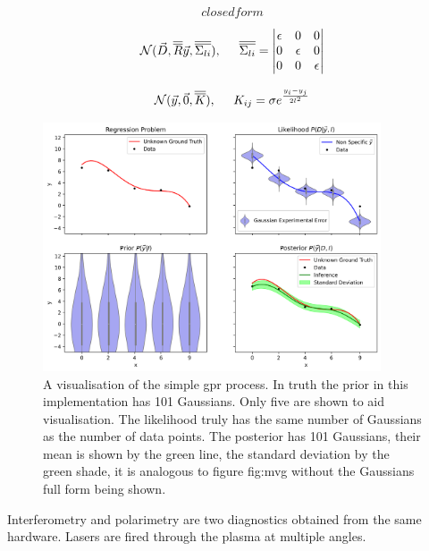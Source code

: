 \begin{equation}
  closed form
  \label{eq:closedform}
\end{equation}

\begin{equation}
    \mathcal{N}(\Vec{D}, \overline{\overline{R}}\Vec{y}, \overline{\overline{\Sigma_{li}}}),\hspace{0.5cm} \overline{\overline{\Sigma_{li}}} = 
      \begin{vmatrix}
          \epsilon & 0 & 0\\
          0 & \epsilon & 0\\
          0 & 0 & \epsilon
      \end{vmatrix}
    \label{eq:likelihood}
\end{equation}

\begin{equation}
  \mathcal{N}(\Vec{y}, \Vec{0}, \overline{\overline{K}}),\hspace{0.5cm} K_{ij} = \sigma e^{\frac{y_i - y_j}{2l^2}}
  \label{eq:prior}
\end{equation}

\begin{figure}
  \centering
  \includegraphics[width=10cm]{images/gprvis.png}
  \caption{A visualisation of the simple \gls{gpr} process. In truth the prior in this implementation has 101 Gaussians. Only five are shown to aid visualisation. The likelihood truly has the same number of Gaussians as the number of data points. The posterior has 101 Gaussians, their mean is shown by the green line, the standard deviation by the green shade, it is analogous to figure fig:mvg without the Gaussians full form being shown.}
  \label{fig:gprvis}
\end{figure}

Interferometry and polarimetry are two diagnostics obtained from the same hardware. Lasers are fired through the plasma at multiple angles. 


